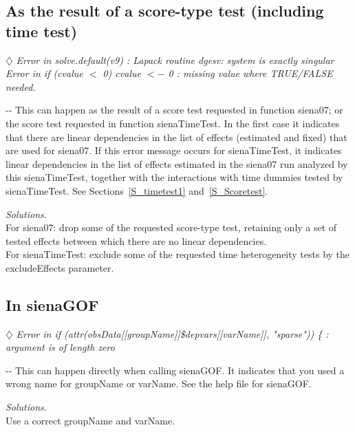 \documentclass[a4paper,fleqn,11pt]{article}
\makeatletter
\newcommand{\+}{\, + \,}
\newcommand{\sfn}[1]{\textsf{#1}}
\newenvironment{indentation}[2]
{\par \setlength{\leftmargin}{#1}       \setlength{\rightmargin}{#2}
  \advance\linewidth -\leftmargin       \advance\linewidth -\rightmargin
  \advance\@totalleftmargin\leftmargin  \@setpar{{\@@par}}%
  \parshape 1 \@totalleftmargin         \linewidth \ignorespaces}{\par}
\makeatother
\begin{document}
\subsection{As the result of a score-type test (including time test)}

$\diamondsuit$
\emph{Error in solve.default(v9) :
   Lapack routine dgesv: system is exactly singular\\
Error in if (cvalue $<$ 0) cvalue $<-$ 0 :
   missing value where TRUE/FALSE needed.}
\smallskip

\begin{indentation}{0.04\textwidth}{0pt}
\noindent
This can happen as the result of a score test requested in function
\textsf{siena07}; or the score test requested in function
\textsf{sienaTimeTest}.
In the first case it indicates that there are linear dependencies in the
list of effects (estimated and fixed)
that are used for \textsf{siena07}.
If this error message occurs for \textsf{sienaTimeTest}, it indicates
linear dependencies in the list of effects estimated
in the \textsf{siena07} run analyzed by this \textsf{sienaTimeTest},
together with the interactions with time dummies tested by
\textsf{sienaTimeTest}.
See Sections~\ref{S_timetest1} and~\ref{S_Scoretest}.
\smallskip

\noindent
\emph{Solutions.} \\
For \textsf{siena07}: drop some of the requested score-type test,
retaining only a set of tested effects between which there are no
linear dependencies.\\
For \textsf{sienaTimeTest}: exclude some of the requested
time heterogeneity tests by the \sfn{excludeEffects} parameter.
\end{indentation}

\subsection{In sienaGOF}

$\diamondsuit$
\emph{Error in if (attr(obsData[[groupName]]\$depvars[[varName]], "sparse")) \{ :\\
  argument is of length zero }
\smallskip

\begin{indentation}{0.04\textwidth}{0pt}
\noindent
This can happen directly when calling \textsf{sienaGOF}.
It indicates that you used a wrong name for \sfn{groupName} or \sfn{varName}.
See the help file for \textsf{sienaGOF}.
\smallskip

\noindent
\emph{Solutions.} \\
Use a correct \sfn{groupName} and \sfn{varName}.
\end{indentation}
\bigskip
\end{document}
